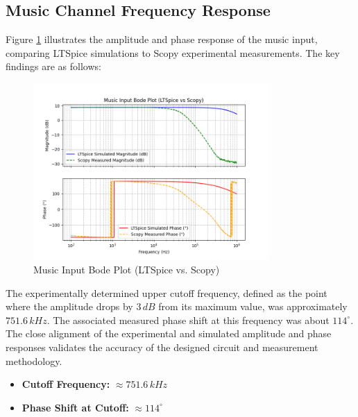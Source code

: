 \documentclass[12pt]{article}
\begin{document}
\subsection{Music Channel Frequency Response}

Figure \ref{fig:music_bode} illustrates the amplitude and phase response of the music input, comparing LTSpice simulations to Scopy experimental measurements. The key findings are as follows:

\begin{figure}[H]
	\centering
	\includegraphics[width=0.8\textwidth]{dp_music}
	\caption{Music Input Bode Plot (LTSpice vs. Scopy)}
	\label{fig:music_bode}
\end{figure}

The experimentally determined upper cutoff frequency, defined as the point where the amplitude drops by $3\,dB$ from its maximum value, was approximately $751.6\,kHz$. The associated measured phase shift at this frequency was about $114^\circ$. The close alignment of the experimental and simulated amplitude and phase responses validates the accuracy of the designed circuit and measurement methodology.

\begin{itemize}
	\item \textbf{Cutoff Frequency:} $\approx 751.6\,kHz$
	\item \textbf{Phase Shift at Cutoff:} $\approx 114^\circ$
\end{itemize}
\end{document}

